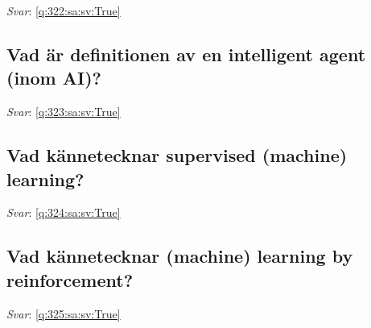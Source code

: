 \documentclass[a4paper,11pt,oneside]{article}
\begin{document}
\begin{sloppypar}
\label{q:322:sa:sv:False}

\vspace{2cm}

\noindent\makebox[\textwidth]{\hrulefill}

\vspace{1cm}

\textit{Svar}: \autoref{q:322:sa:sv:True}



\subsection{Vad \"ar definitionen av en intelligent agent (inom AI)?}

\label{q:323:sa:sv:False}

\vspace{2cm}

\noindent\makebox[\textwidth]{\hrulefill}

\vspace{1cm}

\textit{Svar}: \autoref{q:323:sa:sv:True}



\subsection{Vad k\"annetecknar supervised (machine) learning?}

\label{q:324:sa:sv:False}

\vspace{2cm}

\noindent\makebox[\textwidth]{\hrulefill}

\vspace{1cm}

\textit{Svar}: \autoref{q:324:sa:sv:True}



\subsection{Vad k\"annetecknar (machine) learning by reinforcement?}

\label{q:325:sa:sv:False}

\vspace{2cm}

\noindent\makebox[\textwidth]{\hrulefill}

\vspace{1cm}

\textit{Svar}: \autoref{q:325:sa:sv:True}




\end{sloppypar}
\end{document}
